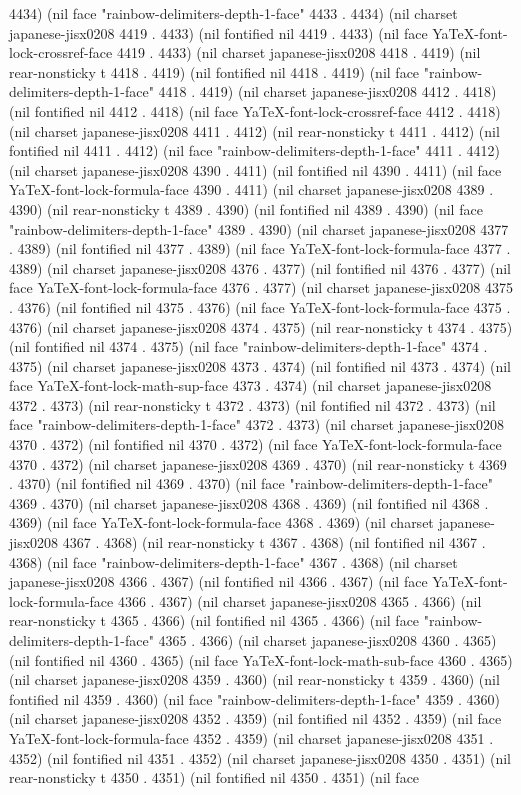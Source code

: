 4434) (nil face "rainbow-delimiters-depth-1-face" 4433 . 4434) (nil charset japanese-jisx0208 4419 . 4433) (nil fontified nil 4419 . 4433) (nil face YaTeX-font-lock-crossref-face 4419 . 4433) (nil charset japanese-jisx0208 4418 . 4419) (nil rear-nonsticky t 4418 . 4419) (nil fontified nil 4418 . 4419) (nil face "rainbow-delimiters-depth-1-face" 4418 . 4419) (nil charset japanese-jisx0208 4412 . 4418) (nil fontified nil 4412 . 4418) (nil face YaTeX-font-lock-crossref-face 4412 . 4418) (nil charset japanese-jisx0208 4411 . 4412) (nil rear-nonsticky t 4411 . 4412) (nil fontified nil 4411 . 4412) (nil face "rainbow-delimiters-depth-1-face" 4411 . 4412) (nil charset japanese-jisx0208 4390 . 4411) (nil fontified nil 4390 . 4411) (nil face YaTeX-font-lock-formula-face 4390 . 4411) (nil charset japanese-jisx0208 4389 . 4390) (nil rear-nonsticky t 4389 . 4390) (nil fontified nil 4389 . 4390) (nil face "rainbow-delimiters-depth-1-face" 4389 . 4390) (nil charset japanese-jisx0208 4377 . 4389) (nil fontified nil 4377 . 4389) (nil face YaTeX-font-lock-formula-face 4377 . 4389) (nil charset japanese-jisx0208 4376 . 4377) (nil fontified nil 4376 . 4377) (nil face YaTeX-font-lock-formula-face 4376 . 4377) (nil charset japanese-jisx0208 4375 . 4376) (nil fontified nil 4375 . 4376) (nil face YaTeX-font-lock-formula-face 4375 . 4376) (nil charset japanese-jisx0208 4374 . 4375) (nil rear-nonsticky t 4374 . 4375) (nil fontified nil 4374 . 4375) (nil face "rainbow-delimiters-depth-1-face" 4374 . 4375) (nil charset japanese-jisx0208 4373 . 4374) (nil fontified nil 4373 . 4374) (nil face YaTeX-font-lock-math-sup-face 4373 . 4374) (nil charset japanese-jisx0208 4372 . 4373) (nil rear-nonsticky t 4372 . 4373) (nil fontified nil 4372 . 4373) (nil face "rainbow-delimiters-depth-1-face" 4372 . 4373) (nil charset japanese-jisx0208 4370 . 4372) (nil fontified nil 4370 . 4372) (nil face YaTeX-font-lock-formula-face 4370 . 4372) (nil charset japanese-jisx0208 4369 . 4370) (nil rear-nonsticky t 4369 . 4370) (nil fontified nil 4369 . 4370) (nil face "rainbow-delimiters-depth-1-face" 4369 . 4370) (nil charset japanese-jisx0208 4368 . 4369) (nil fontified nil 4368 . 4369) (nil face YaTeX-font-lock-formula-face 4368 . 4369) (nil charset japanese-jisx0208 4367 . 4368) (nil rear-nonsticky t 4367 . 4368) (nil fontified nil 4367 . 4368) (nil face "rainbow-delimiters-depth-1-face" 4367 . 4368) (nil charset japanese-jisx0208 4366 . 4367) (nil fontified nil 4366 . 4367) (nil face YaTeX-font-lock-formula-face 4366 . 4367) (nil charset japanese-jisx0208 4365 . 4366) (nil rear-nonsticky t 4365 . 4366) (nil fontified nil 4365 . 4366) (nil face "rainbow-delimiters-depth-1-face" 4365 . 4366) (nil charset japanese-jisx0208 4360 . 4365) (nil fontified nil 4360 . 4365) (nil face YaTeX-font-lock-math-sub-face 4360 . 4365) (nil charset japanese-jisx0208 4359 . 4360) (nil rear-nonsticky t 4359 . 4360) (nil fontified nil 4359 . 4360) (nil face "rainbow-delimiters-depth-1-face" 4359 . 4360) (nil charset japanese-jisx0208 4352 . 4359) (nil fontified nil 4352 . 4359) (nil face YaTeX-font-lock-formula-face 4352 . 4359) (nil charset japanese-jisx0208 4351 . 4352) (nil fontified nil 4351 . 4352) (nil charset japanese-jisx0208 4350 . 4351) (nil rear-nonsticky t 4350 . 4351) (nil fontified nil 4350 . 4351) (nil face 